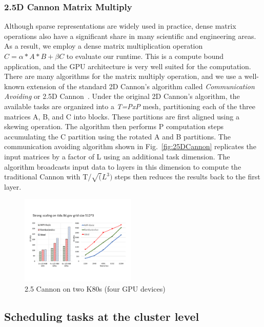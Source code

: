 \subsubsection{2.5D Cannon Matrix Multiply}
Although sparse representations are widely used in practice, dense matrix operations also have a significant share in many scientific and engineering areas.
As a result, we employ a dense matrix multiplication operation $C = \alpha* A * B + \beta C$ to evaluate our runtime.
This is a compute bound application, and the GPU architecture is very well suited for the computation. 
There are many algorithms for the matrix multiply operation, and we use a well-known extension of the standard 2D Cannon's algorithm called {\em Communication Avoiding} or 2.5D Cannon~\cite{25Dcannon}. 
Under the original 2D Cannon's algorithm, the available tasks are organized into a {\em T=PxP} mesh, partitioning each of the three matrices A, B, and C into blocks.
These partitions are first aligned using a skewing operation.
The algorithm then performs P computation steps accumulating the C partition using the rotated A and B partitions.
The communication avoiding algorithm shown in Fig.~\ref{fig:25DCannon} replicates the input matrices by a factor of L using an additional task dimension.
The algorithm broadcasts input data to layers in this dimension to compute the traditional Cannon with T/$\sqrt(L^3)$ steps then reduces the results back to the first layer.



\begin{figure}[htb]
\centering
\includegraphics[width=0.49\textwidth]{figures/cannon_tida.pdf}
\caption{2.5 Cannon on two K80s (four GPU devices)}
\label{cannin_onnode}
\end{figure}




\subsection{Scheduling tasks at the cluster level}

